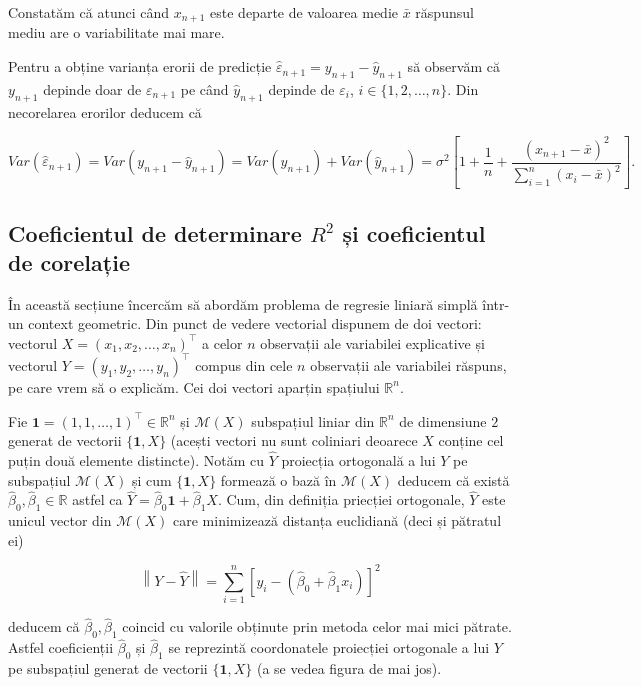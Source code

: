 \documentclass[]{article}
\newcounter{exo}[section]
\begin{document}
Constatăm că atunci când \(x_{n+1}\) este departe de valoarea medie
\(\bar x\) răspunsul mediu are o variabilitate mai mare.

Pentru a obține varianța erorii de predicție
\(\hat\varepsilon_{n+1} = y_{n+1} - \hat y_{n+1}\) să observăm că
\(y_{n+1}\) depinde doar de \(\varepsilon_{n+1}\) pe când
\(\hat y_{n+1}\) depinde de \(\varepsilon_i\), \(i\in\{1,2,\ldots,n\}\).
Din necorelarea erorilor deducem că

\[
  Var(\hat\varepsilon_{n+1}) = Var(y_{n+1} - \hat y_{n+1}) = Var(y_{n+1}) + Var(\hat y_{n+1}) = \sigma^2\left[1 + \frac{1}{n} + \frac{(x_{n+1} - \bar x)^2}{\sum_{i=1}^{n}(x_i - \bar x)^2}\right].
\]

\hypertarget{reg_sim_ex_2}{\subsection{\texorpdfstring{Coeficientul de
determinare \(R^2\) și coeficientul de
corelație}{Coeficientul de determinare R\^{}2 și coeficientul de corelație}}\label{reg_sim_ex_2}}

În această secțiune încercăm să abordăm problema de regresie liniară
simplă într-un context geometric. Din punct de vedere vectorial dispunem
de doi vectori: vectorul \(X = (x_1, x_2, \ldots, x_n)^\intercal\) a
celor \(n\) observații ale variabilei explicative și vectorul
\(Y = (y_1, y_2, \ldots, y_n)^\intercal\) compus din cele \(n\)
observații ale variabilei răspuns, pe care vrem să o explicăm. Cei doi
vectori aparțin spațiului \(\mathbb{R}^n\).

Fie \(\mathbf{1} = (1,1,\ldots,1)^\intercal\in\mathbb{R}^n\) și
\(\mathcal{M}(X)\) subspațiul liniar din \(\mathbb{R}^n\) de dimensiune
\(2\) generat de vectorii \(\{\mathbf{1}, X\}\) (acești vectori nu sunt
coliniari deoarece \(X\) conține cel puțin două elemente distincte).
Notăm cu \(\hat Y\) proiecția ortogonală a lui \(Y\) pe subspațiul
\(\mathcal{M}(X)\) și cum \(\{\mathbf{1}, X\}\) formează o bază în
\(\mathcal{M}(X)\) deducem că există
\(\hat\beta_0, \hat\beta_1\in \mathbb{R}\) astfel ca
\(\hat Y = \hat\beta_0\mathbf{1} + \hat\beta_1 X\). Cum, din definiția
priecției ortogonale, \(\hat Y\) este unicul vector din
\(\mathcal{M}(X)\) care minimizează distanța euclidiană (deci și
pătratul ei)

\[
\left\lVert Y - \hat Y \right\rVert = \sum_{i = 1}^{n}[y_i - (\hat\beta_0 + \hat \beta_1 x_i)]^2
\]

deducem că \(\hat\beta_0, \hat\beta_1\) coincid cu valorile obținute
prin metoda celor mai mici pătrate. Astfel coeficienții \(\hat\beta_0\)
și \(\hat\beta_1\) se reprezintă coordonatele proiecției ortogonale a
lui \(Y\) pe subspațiul generat de vectorii \(\{\mathbf{1}, X\}\) (a se
vedea figura de mai jos).
\end{document}
